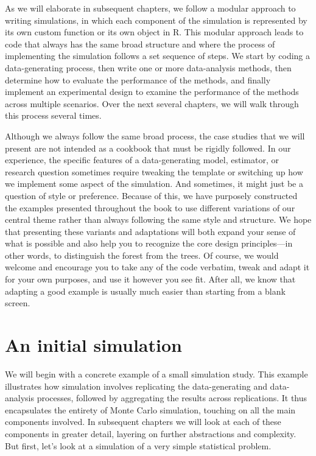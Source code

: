 \documentclass[
]{book}
\begin{document}
As we will elaborate in subsequent chapters, we follow a modular approach to writing simulations, in which each component of the simulation is represented by its own custom function or its own object in R.
This modular approach leads to code that always has the same broad structure and where the process of implementing the simulation follows a set sequence of steps.
We start by coding a data-generating process, then write one or more data-analysis methods, then determine how to evaluate the performance of the methods, and finally implement an experimental design to examine the performance of the methods across multiple scenarios.
Over the next several chapters, we will walk through this process several times.

Although we always follow the same broad process, the case studies that we will present are not intended as a cookbook that must be rigidly followed.
In our experience, the specific features of a data-generating model, estimator, or research question sometimes require tweaking the template or switching up how we implement some aspect of the simulation.
And sometimes, it might just be a question of style or preference.
Because of this, we have purposely constructed the examples presented throughout the book to use different variations of our central theme rather than always following the same style and structure.
We hope that presenting these variants and adaptations will both expand your sense of what is possible and also help you to recognize the core design principles---in other words, to distinguish the forest from the trees.
Of course, we would welcome and encourage you to take any of the code verbatim, tweak and adapt it for your own purposes, and use it however you see fit.
After all, we know that adapting a good example is usually much easier than starting from a blank screen.

\chapter{An initial simulation}\label{t-test-simulation}

We will begin with a concrete example of a small simulation study.
This example illustrates how simulation involves replicating the data-generating and data-analysis processes, followed by aggregating the results across replications.
It thus encapsulates the entirety of Monte Carlo simulation, touching on all the main components involved.
In subsequent chapters we will look at each of these components in greater detail, layering on further abstractions and complexity.
But first, let's look at a simulation of a very simple statistical problem.
\end{document}
